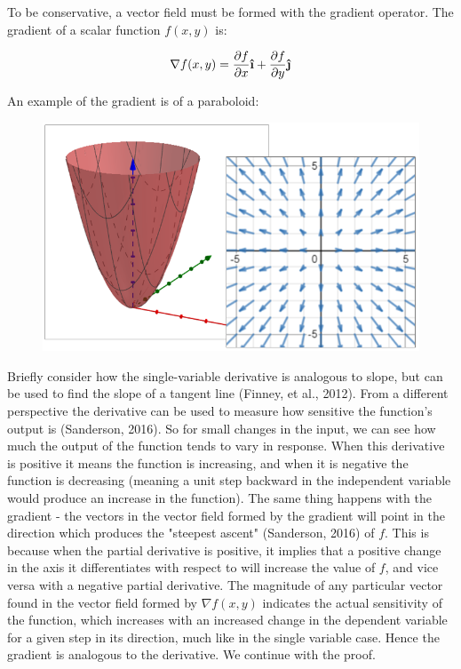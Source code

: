 \documentclass[11pt]{article}
\newcommand{\ihat}{\boldsymbol{\hat{\textbf{\i}}}}
\newcommand{\jhat}{\boldsymbol{\hat{\textbf{\j}}}}
\begin{document}

To be conservative, a vector field must be formed with the gradient operator. The gradient of a scalar function $f(x,y)$ is:

$$\nabla f(x,y) = \frac{\partial f}{\partial x}\ihat + \frac{\partial f}{\partial y}\jhat$$

An example of the gradient is of a paraboloid:

\begin{figure}[h]
\centering
\includegraphics[scale=0.75]{gradient}
\end{figure}

Briefly consider how the single-variable derivative is analogous to slope, but can be used to find the slope of a tangent line (Finney, et al., 2012). From a different perspective the derivative can be used to measure how sensitive the function's output is (Sanderson, 2016). So for small changes in the input, we can see how much the output of the function tends to vary in response. When this derivative is positive it means the function is increasing, and when it is negative the function is decreasing (meaning a unit step backward in the independent variable would produce an increase in the function). The same thing happens with the gradient - the vectors in the vector field formed by the gradient will point in the direction which produces the "steepest ascent" (Sanderson, 2016) of $f$. This is because when the partial derivative is positive, it implies that a positive change in the axis it differentiates with respect to will increase the value of $f$, and vice versa with a negative partial derivative. The magnitude of any particular vector found in the vector field formed by $\nabla f(x,y)$ indicates the actual sensitivity of the function, which increases with an increased change in the dependent variable for a given step in its direction, much like in the single variable case. Hence the gradient is analogous to the derivative. We continue with the proof.
\end{document}
